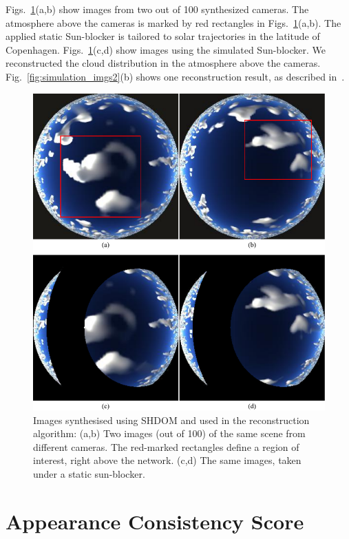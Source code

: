 \documentclass[runningheads]{llncs}
\begin{document}
Figs.~\ref{fig:simulation_imgs1}(a,b) show images from two out of 100
synthesized cameras. The atmosphere above the cameras is marked by red rectangles in Figs.~\ref{fig:simulation_imgs1}(a,b). The applied static Sun-blocker is tailored to solar trajectories in the latitude of Copenhagen. Figs.~\ref{fig:simulation_imgs1}(c,d) show images using the simulated Sun-blocker.
We reconstructed the cloud distribution in the atmosphere above the cameras. Fig.~\ref{fig:simulation_imgs2}(b) shows one reconstruction result, as described in~\cite{danny2014}.
\begin{figure}
  \begin{center}
    \includegraphics{simulation_imgs}
    \caption{Images synthesised using SHDOM and used in the
      reconstruction algorithm: (a,b) Two images (out of 100) of the
      same scene from different cameras. The red-marked rectangles define
      a region of interest, right above the network. (c,d) The
      same images, taken under a static sun-blocker.}
    \label{fig:simulation_imgs1}
  \end{center}
\end{figure}


\section{Appearance Consistency Score}
\label{sec:appearancecore}
\end{document}
